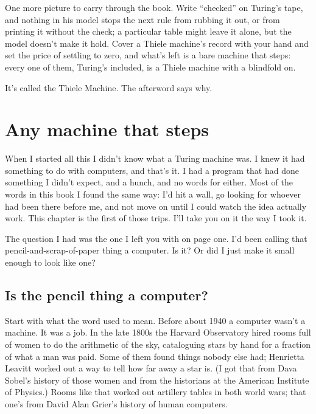 \documentclass[11pt,twoside]{article}
\theoremstyle{thielethm}
\theoremstyle{thieledef}
\theoremstyle{thieledef}
\theoremstyle{thieledef}
\theoremstyle{thielethm}
\theoremstyle{thieleobs}
\theoremstyle{thielethm}
\begin{document}
One more picture to carry through the book. Write ``checked'' on Turing's tape, and nothing in his model stops the next rule from rubbing it out, or from printing it without the check; a particular table might leave it alone, but the model doesn't make it hold. Cover a Thiele machine's record with your hand and set the price of settling to zero, and what's left is a bare machine that steps: every one of them, Turing's included, is a Thiele machine with a blindfold on.

It's called the Thiele Machine. The afterword says why.

\section{Any machine that steps}
\label{sec:steps}

When I started all this I didn't know what a Turing machine was. I knew it had something to do with computers, and that's it. I had a program that had done something I didn't expect, and a hunch, and no words for either. Most of the words in this book I found the same way: I'd hit a wall, go looking for whoever had been there before me, and not move on until I could watch the idea actually work. This chapter is the first of those trips. I'll take you on it the way I took it.

The question I had was the one I left you with on page one. I'd been calling that pencil-and-scrap-of-paper thing a computer. Is it? Or did I just make it small enough to look like one?

\subsection{Is the pencil thing a computer?}

Start with what the word used to mean. Before about 1940 a computer wasn't a machine. It was a job. In the late 1800s the Harvard Observatory hired rooms full of women to do the arithmetic of the sky, cataloguing stars by hand for a fraction of what a man was paid. Some of them found things nobody else had; Henrietta Leavitt worked out a way to tell how far away a star is. (I got that from Dava Sobel's history of those women and from the historians at the American Institute of Physics.) Rooms like that worked out artillery tables in both world wars; that one's from David Alan Grier's history of human computers.
\end{document}
